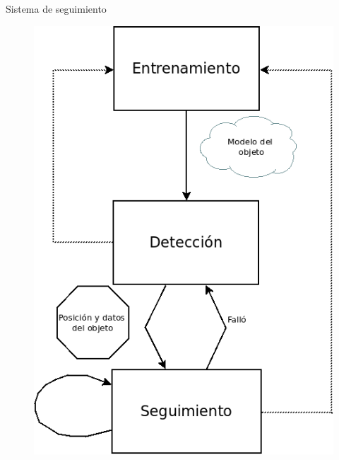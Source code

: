 \documentclass[]{beamer}
\begin{document}
\begin{frame}[t]{Sistema de seguimiento}
    \begin{figure}[t]
        \centering
        \vspace{-13pt}
        \includegraphics[scale=0.3]{img/esquema_seguimiento.png}
    \end{figure}
\end{frame}
\end{document}
